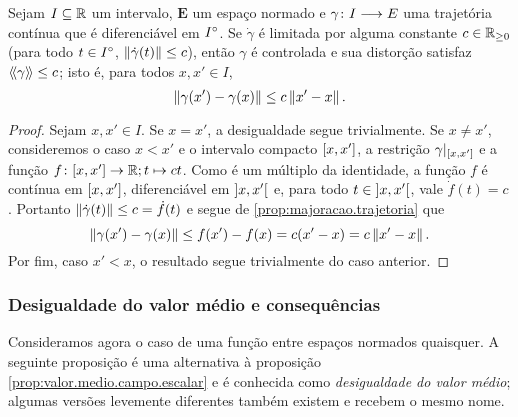 \begin{proposition}
\label{prop:derivada.limitada.trajetoria.controlada}
Sejam $I \subseteq \mathbb{R}$ um intervalo, $\bm E$ um espaço normado e $\gamma\colon \allowbreak I \longrightarrow E$ uma trajetória contínua que é diferenciável em ${I}^\circ$. Se $\dot \gamma$ é limitada por alguma constante $c \in \mathbb{R}_{\geq 0}$ (para todo $t \in {I}^\circ$, $\left\Vert{\dot \gamma(t)}\right\Vert \leq c$), então $\gamma$ é controlada e sua distorção satisfaz $\langle\!\langle{\gamma}\rangle\!\rangle \leq c$; isto é, para todos $x,x' \in I$,
	\begin{equation*}
	\left\Vert{\gamma(x') - \gamma(x)}\right\Vert \leq c\left\Vert{x' - x}\right\Vert.
	\end{equation*}
\end{proposition}
\begin{proof}
Sejam $x,x' \in I$. Se $x=x'$, a desigualdade segue trivialmente. Se $x \neq x'$, consideremos o caso $x < x'$ e o intervalo compacto $\left[x,\allowbreak x'\right]$, a restrição $\gamma|_{\left[x,\allowbreak x'\right]}$ e a função ${f} \colon {\left[x,\allowbreak x'\right]} \to {\mathbb{R}}; {t} \mapsto ct$. Como é um múltiplo da identidade, a função $f$ é contínua em $\left[x,\allowbreak x'\right]$, diferenciável em $\left]x,\allowbreak x'\right[$ e, para todo $t \in \left]x,\allowbreak x'\right[$, vale $\dot f(t) = c$. Portanto $\left\Vert{\dot \gamma(t)}\right\Vert \leq c = \dot f(t)$ e segue de \ref{prop:majoracao.trajetoria} que
	\begin{equation*}
	\left\Vert{\gamma(x') - \gamma(x)}\right\Vert \leq f(x') - f(x) = c(x' - x) = c \left\Vert{x' - x}\right\Vert.
	\end{equation*}
Por fim, caso $x' < x$, o resultado segue trivialmente do caso anterior.
\end{proof}

\subsubsection{Desigualdade do valor médio e consequências}

Consideramos agora o caso de uma função entre espaços normados quaisquer. A seguinte proposição é uma alternativa à proposição \ref{prop:valor.medio.campo.escalar} e é conhecida como \textit{desigualdade do valor médio}; algumas versões levemente diferentes também existem e recebem o mesmo nome.

